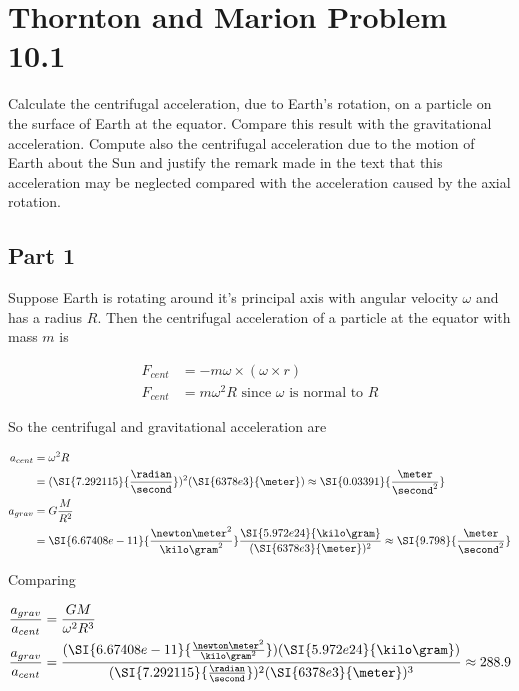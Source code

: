 \section{Thornton and Marion Problem 10.1}
Calculate the centrifugal acceleration, due to Earth's rotation, on a particle on the surface of Earth at the equator. Compare this result with the gravitational acceleration. Compute also the centrifugal acceleration due to the motion of Earth about the Sun and justify the remark made in the text that this acceleration may be neglected compared with the acceleration caused by the axial rotation.

\subsection{Part 1}
Suppose Earth is rotating around it's principal axis with angular velocity $\omega$ and has a radius $R$. Then the centrifugal acceleration of a particle at the equator with mass $m$ is

\begin{equation}
    \begin{split}
        F_{cent} &= -m \omega \times (\omega \times r)\\
        F_{cent} &= m\omega^2R \textrm{ since $\omega$ is normal to $R$}
    \end{split}
\end{equation}

So the centrifugal and gravitational acceleration are

\begin{equation}
    \begin{split}
        a_{cent} &= \omega^2R\\
        &= (\SI{7.292115}{\frac{\radian}{\second}})^2(\SI{6378e3}{\meter}) \approx \SI{0.03391}{\frac{\meter}{\second^2}}\\
        a_{grav} &= G\frac{M}{R^2}\\
        &= \SI{6.67408e-11}{\frac{\newton\meter^2}{\kilo\gram^2}}\frac{\SI{5.972e24}{\kilo\gram}}{(\SI{6378e3}{\meter})^2} \approx \SI{9.798}{\frac{\meter}{\second^2}}
    \end{split}
\end{equation}

Comparing

\begin{equation}
    \begin{split}
        \frac{a_{grav}}{a_{cent}} &= \frac{GM}{\omega^2R^3}\\
        \frac{a_{grav}}{a_{cent}} &= \frac{(\SI{6.67408e-11}{\frac{\newton\meter^2}{\kilo\gram^2}})(\SI{5.972e24}{\kilo\gram})}{(\SI{7.292115}{\frac{\radian}{\second}})^2(\SI{6378e3}{\meter})^3} \approx 288.9
    \end{split}
\end{equation}

